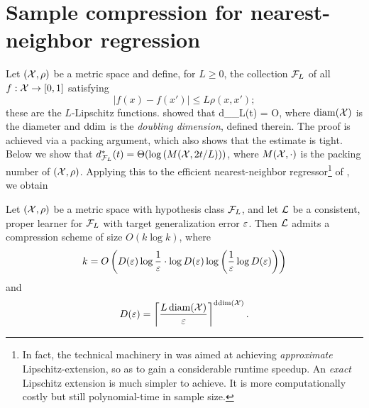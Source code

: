 \section{Sample compression for nearest-neighbor regression}
\label{sec:NN}
Let $(\mathcal{X},\rho)$ be a metric space
and define, for $L\ge0$, the collection $\mathcal{F}_L$ of all $f:\mathcal{X}\to[0,1]$ satisfying
$$ |f(x)-f(x')|\le L\rho(x,x');$$
these are the $L$-Lipschitz functions.
\citet{GottliebKK17_IEEE} showed that
\beq
d_{\F_L}(t) = O,
\eeq
where $\operatorname{diam}(\mathcal{X})$ is the diameter and $\operatorname{ddim}$ is the {\em doubling dimension}, defined therein.
The proof is achieved via a packing argument, which also shows that the estimate is tight.
Below we show that
$  d^*_{\mathcal{F}_L}(t) =
\Theta(\log\left({M}(\mathcal{X},2t/L)\right))$,
where $M(\mathcal{X},\cdot)$ is the packing number of $(\mathcal{X},\rho)$.
Applying this to the efficient
nearest-neighbor regressor\footnote{
  In fact, the technical machinery in
  \citet{DBLP:journals/tit/GottliebKK17}
  was aimed at achieving {\em approximate} Lipschitz-extension,
  so as to gain a considerable runtime speedup. An {\em exact} Lipschitz extension
  is much simpler to achieve. It is more computationally costly but still polynomial-time in sample size.
  }
of
\citet{DBLP:journals/tit/GottliebKK17},
we obtain
\begin{corollary}
  Let $(\mathcal{X},\rho)$ be a metric space with hypothesis class $\mathcal{F}_L$,
  and let $\mathcal{L}$ be a consistent, proper learner for $\mathcal{F}_L$ with target generalization error $\varepsilon$.
Then $\mathcal{L}$ admits a compression scheme of size $O(k\log k)$, where
  \[k = {O}\left( D(\varepsilon) \log \frac{1}{\varepsilon} \cdot \log D(\varepsilon)
      \log \left(\frac{1}{\varepsilon} \log D(\varepsilon) \right) \right)\]
%
and
\[D(\varepsilon) = \left\lceil\frac{L\operatorname{diam}(\mathcal{X})}{\varepsilon}\right\rceil^{\operatorname{ddim}(\mathcal{X})}.\]
\end{corollary}




